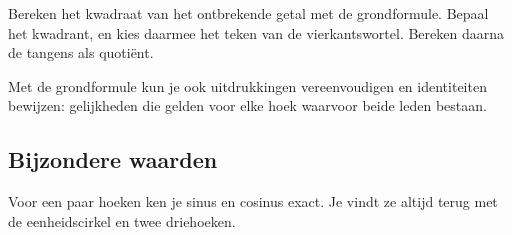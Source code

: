 \begin{werkwijze}
Bereken het kwadraat van het ontbrekende getal met de grondformule. Bepaal het kwadrant, en kies daarmee het teken van de vierkantswortel. Bereken daarna de tangens als quotiënt.
\end{werkwijze}

\begin{oefeningen}
\end{oefeningen}

Met de grondformule kun je ook uitdrukkingen vereenvoudigen en identiteiten bewijzen: gelijkheden die gelden voor elke hoek waarvoor beide leden bestaan.


\begin{oefeningen}
\end{oefeningen}

\subsection{Bijzondere waarden}

Voor een paar hoeken ken je sinus en cosinus exact. Je vindt ze altijd terug met de eenheidscirkel en twee driehoeken.

